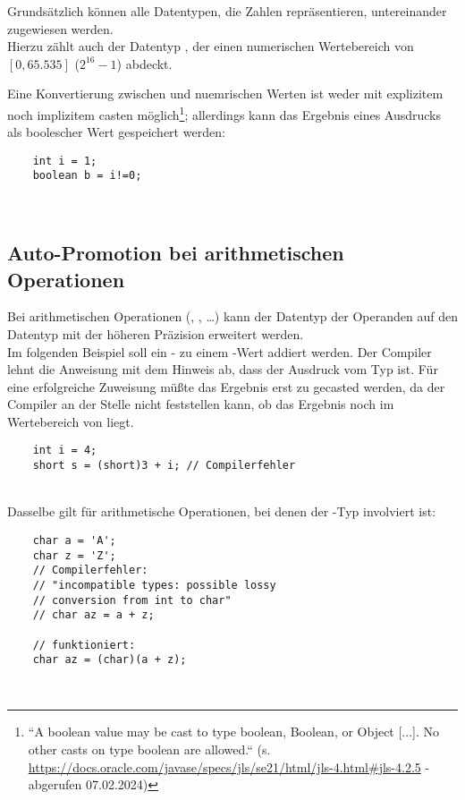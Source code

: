 \noindent
Grundsätzlich können alle Datentypen, die Zahlen repräsentieren, untereinander zugewiesen werden.\\
Hierzu zählt auch der Datentyp , der einen numerischen Wertebereich von $[0, 65.535]$ ($2^{16}-1$) abdeckt.

\noindent
Eine Konvertierung zwischen  und nuemrischen Werten ist weder mit explizitem noch implizitem casten möglich\footnote{
``A boolean value may be cast to type boolean, Boolean, or Object [...]. No other casts on type boolean are allowed.`` (s. \url{https://docs.oracle.com/javase/specs/jls/se21/html/jls-4.html#jls-4.2.5} - abgerufen 07.02.2024)
}; allerdings kann das Ergebnis eines Ausdrucks als boolescher Wert gespeichert werden:
\begin{verbatim}
    int i = 1;
    boolean b = i!=0;
\end{verbatim}\\

\subsection{Auto-Promotion bei arithmetischen Operationen}

Bei arithmetischen Operationen (\code{+}, \code{-}, \ldots) kann der Datentyp der Operanden auf den Datentyp mit der höheren Präzision erweitert werden.\\

\noindent
Im folgenden Beispiel soll ein - zu einem -Wert addiert werden.
Der Compiler lehnt die Anweisung mit dem Hinweis ab, dass der Ausdruck  vom Typ  ist.
Für eine erfolgreiche Zuweisung müßte das Ergebnis erst zu  gecasted werden, da der Compiler an der Stelle nicht feststellen kann, ob das Ergebnis noch im Wertebereich von  liegt.

\begin{verbatim}
    int i = 4;
    short s = (short)3 + i; // Compilerfehler
\end{verbatim}\\

Dasselbe gilt für arithmetische Operationen, bei denen der -Typ involviert ist:


\begin{verbatim}
    char a = 'A';
    char z = 'Z';
    // Compilerfehler:
    // "incompatible types: possible lossy
    // conversion from int to char"
    // char az = a + z;

    // funktioniert:
    char az = (char)(a + z);
\end{verbatim}\\


